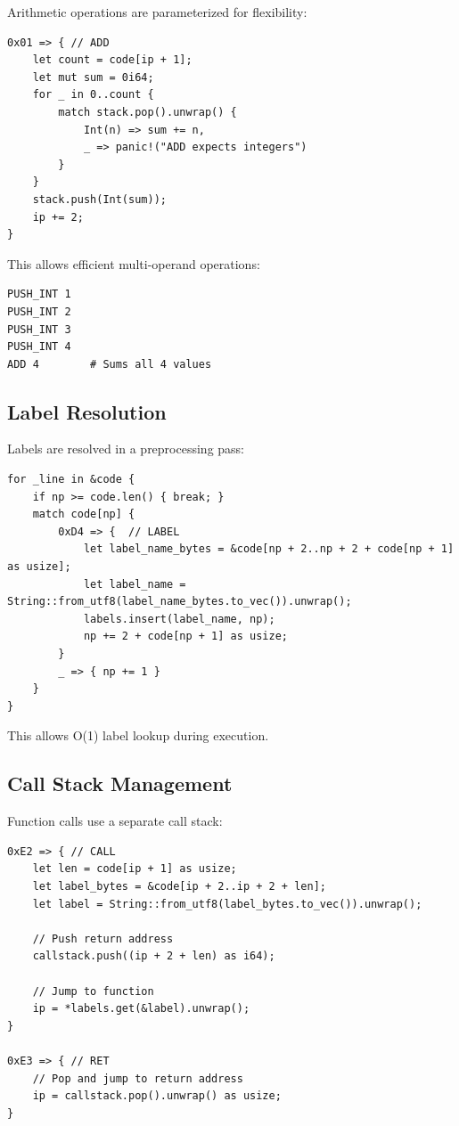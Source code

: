 \documentclass[11pt,a4paper]{article}
\begin{document}
Arithmetic operations are parameterized for flexibility:

\begin{lstlisting}[style=rustcode]
0x01 => { // ADD
    let count = code[ip + 1];
    let mut sum = 0i64;
    for _ in 0..count {
        match stack.pop().unwrap() {
            Int(n) => sum += n,
            _ => panic!("ADD expects integers")
        }
    }
    stack.push(Int(sum));
    ip += 2;
}
\end{lstlisting}

This allows efficient multi-operand operations:
\begin{verbatim}
PUSH_INT 1
PUSH_INT 2
PUSH_INT 3
PUSH_INT 4
ADD 4        # Sums all 4 values
\end{verbatim}

\subsection{Label Resolution}

Labels are resolved in a preprocessing pass:

\begin{lstlisting}[style=rustcode]
for _line in &code {
    if np >= code.len() { break; }
    match code[np] {
        0xD4 => {  // LABEL
            let label_name_bytes = &code[np + 2..np + 2 + code[np + 1] as usize];
            let label_name = String::from_utf8(label_name_bytes.to_vec()).unwrap();
            labels.insert(label_name, np);
            np += 2 + code[np + 1] as usize;
        }
        _ => { np += 1 }
    }
}
\end{lstlisting}

This allows O(1) label lookup during execution.

\subsection{Call Stack Management}

Function calls use a separate call stack:

\begin{lstlisting}[style=rustcode]
0xE2 => { // CALL
    let len = code[ip + 1] as usize;
    let label_bytes = &code[ip + 2..ip + 2 + len];
    let label = String::from_utf8(label_bytes.to_vec()).unwrap();
    
    // Push return address
    callstack.push((ip + 2 + len) as i64);
    
    // Jump to function
    ip = *labels.get(&label).unwrap();
}

0xE3 => { // RET
    // Pop and jump to return address
    ip = callstack.pop().unwrap() as usize;
}
\end{lstlisting}
\end{document}
